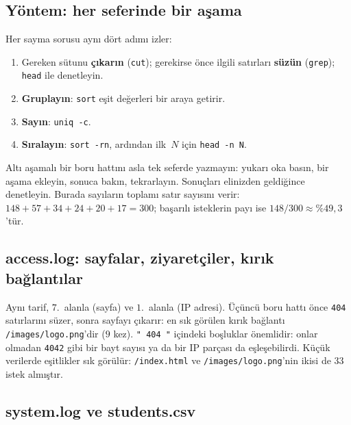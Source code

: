 \documentclass[11pt,a4paper]{article}
\newcommand{\cmd}[1]{\texttt{#1}}
\begin{document}
\subsection{Yöntem: her seferinde bir aşama}




Her sayma sorusu aynı dört adımı izler:
\begin{enumerate}[leftmargin=1.4em]
  \item Gereken sütunu \textbf{çıkarın} (\cmd{cut}); gerekirse önce ilgili satırları \textbf{süzün} (\cmd{grep}); \cmd{head} ile denetleyin.
  \item \textbf{Gruplayın}: \cmd{sort} eşit değerleri bir araya getirir.
  \item \textbf{Sayın}: \cmd{uniq -c}.
  \item \textbf{Sıralayın}: \cmd{sort -rn}, ardından ilk~$N$ için \cmd{head -n N}.
\end{enumerate}
Altı aşamalı bir boru hattını asla tek seferde yazmayın: yukarı oka basın, bir aşama ekleyin, sonuca bakın, tekrarlayın. Sonuçları elinizden geldiğince denetleyin. Burada sayıların toplamı satır sayısını verir: $148 + 57 + 34 + 24 + 20 + 17 = 300$; başarılı isteklerin payı ise $148/300 \approx \%49{,}3$'tür.

\subsection{access.log: sayfalar, ziyaretçiler, kırık bağlantılar}



Aynı tarif, $7$.~alanla (sayfa) ve $1$.~alanla (IP adresi). Üçüncü boru hattı önce \texttt{404} satırlarını süzer, sonra sayfayı çıkarır: en sık görülen kırık bağlantı \texttt{/images/logo.png}'dir ($9$ kez). \texttt{" 404 "} içindeki boşluklar önemlidir: onlar olmadan \texttt{4042} gibi bir bayt sayısı ya da bir IP parçası da eşleşebilirdi. Küçük verilerde eşitlikler sık görülür: \texttt{/index.html} ve \texttt{/images/logo.png}'nin ikisi de $33$ istek almıştır.

\subsection{system.log ve students.csv}


\end{document}
